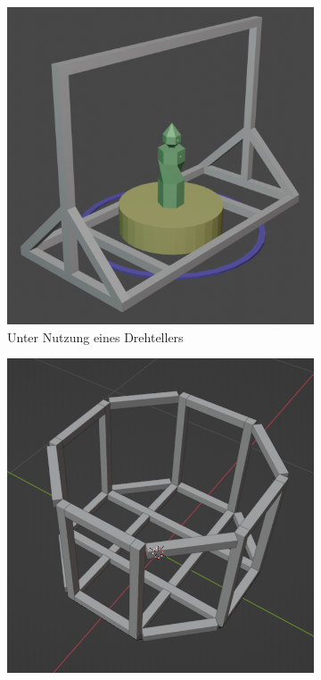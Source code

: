 \documentclass[./00PhotoBox.tex]{subfiles}
\begin{document}
\begin{figure}
    \centering
    \begin{subfigure}{0.30\textwidth}
        \includegraphics[height=1\linewidth]{./img/modell1.png}
        \centering
        \caption{Unter Nutzung eines Drehtellers}
        \label{img:entwurf1}
    \end{subfigure}
    \begin{subfigure}{0.30\textwidth}
        \includegraphics[height=1\linewidth]{./img/modell2.png}

\end{subfigure}
\end{figure}
\end{document}

